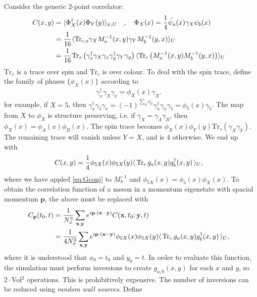 Consider the generic 2-point correlator:
\begin{align}
  \nonumber
  C(x,y) &= \langle \Phi^{\dagger}_X(x) \Phi_Y(y) \rangle_{\psi,U} \quad , \quad \Phi_X(x) = {1\over 4}\bar{\psi}_a(x) \gamma_X \psi_b(x) \\
  \nonumber
  &= {1\over 16}\langle \text{Tr}_{c,s} \gamma_X M^{-1}_{a}(x,y) \gamma_Y M^{-1}_{b}(y,x) \rangle_U \\
  &= {1\over 16}\text{Tr}_s \left( \gamma^{\dagger}_x \gamma_X \gamma_x \gamma_y^{\dagger} \gamma_Y \gamma_y \right)
  \langle \text{Tr}_c \left( M^{-1}_{a}(x,y) M^{-1}_{b}(y,x) \right) \rangle_U
\end{align}
$\text{Tr}_s$ is a trace over spin and $\text{Tr}_c$ is over colour. To deal with the spin trace, define the family of phases $\{\phi_X(x)\}$ according to
\begin{align}
  \gamma^{\dagger}_x\gamma_X\gamma_x = \phi_X(x) \gamma_X.
\end{align}
for example, if $X=5$, then $\gamma^{\dagger}_x\gamma_5\gamma_x = (-1)^{\sum_{\mu}x_{\mu}} \gamma^{\dagger}_x\gamma_x \gamma_5 = \phi_5(x) \gamma_5$. The map from $X$ to $\phi_X$ is structure preserving, i.e. if $\gamma_X=\gamma_A\gamma_B$, then $\phi_X(x)=\phi_A(x)\phi_B(x)$. The spin trace becomes $\phi_X(x)\phi_Y(y) \text{Tr}_s\left( \gamma_X \gamma_Y \right)$. The remaining trace will vanish unless $Y=X$, and is 4 otherwise. We end up with
\begin{align}
  C(x,y) = {1\over 4} \phi_{5X}(x)\phi_{5X}(y) \langle \,\text{Tr}_c \,g_a(x,y) g^{\dagger}_b(x,y) \,\rangle_U,
\end{align}
where we have appled \eqref{eq:Gconj} to $M^{-1}_b$ and $\phi_{5X}(x) = \phi_5(x)\phi_X(x)$. To obtain the correlation function of a meson in a momentum eigenstate with spacial momentum ${\textbf{p}}$, the above must be replaced with
\begin{align}
  \nonumber
  C_{\textbf{p}}(t_0,t) &= {1\over N_x^3} \sum_{{\textbf{x}},{\textbf{y}}} e^{i{\textbf{p}}\cdot({\textbf{x}}-{\textbf{y}})}
  C({\textbf{x}},t_0;{\textbf{y}},t) \\
  &= {1\over 4 N_x^3} \sum_{{\textbf{x}},{\textbf{y}}} e^{i{\textbf{p}}\cdot({\textbf{x}}-{\textbf{y}})} \phi_{5X}(x)\phi_{5X}(y) \langle \,\text{Tr}_c \,g_a(x,y)g^{\dagger}_b(x,y)\,\rangle_U,
\end{align}
where it is understood that $x_0=t_0$ and $y_0=t$. In order to evaluate this function, the simulation must perform inversions to create $g_{a/b}(x,y)$ for each $x$ and $y$, so $2\cdot$Vol$^2$ operations. This is prohibitively expensive. The number of inversions can be reduced using {\it{random wall sources}}. Define
